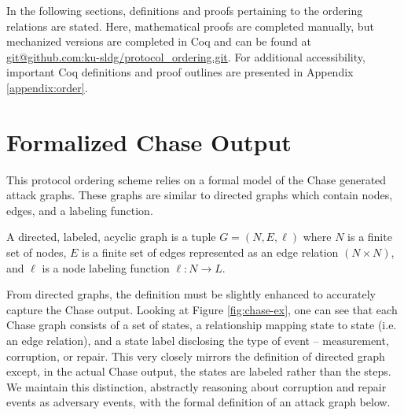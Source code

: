 \documentclass[runningheads]{llncs}
\theoremstyle{definition}
\begin{document}
In the following sections, definitions and proofs pertaining to the ordering relations are stated. Here, mathematical proofs are completed manually, but mechanized versions are completed in Coq and can be found at \url{git@github.com:ku-sldg/protocol_ordering.git}. For additional accessibility, important Coq definitions and proof outlines are presented in Appendix \ref{appendix:order}.


\section{Formalized Chase Output}

This protocol ordering scheme relies on a formal model of the Chase generated attack graphs. These graphs are similar to directed graphs which contain nodes, edges, and a labeling function. 

\begin{definition}
    A directed, labeled, acyclic graph is a tuple $ G = (N, E, \ell)$ where $N$ is a finite set of nodes, $E$ is a finite set of edges represented as an edge relation $( N \times N)$, and $\ell$ is a node labeling function $\ell : N \rightarrow L$. 
\end{definition}

From directed graphs, the definition must be slightly enhanced to accurately capture the Chase output. Looking at Figure \ref{fig:chase-ex}, one can see that each Chase graph consists of a set of states, a relationship mapping state to state (i.e. an edge relation), and a state label disclosing the type of event -- measurement, corruption, or repair. This very closely mirrors the definition of directed graph except, in the actual Chase output, the states are labeled rather than the steps. We maintain this distinction, abstractly reasoning about corruption and repair events as adversary events, with the formal definition of an attack graph below. 
\end{document}
